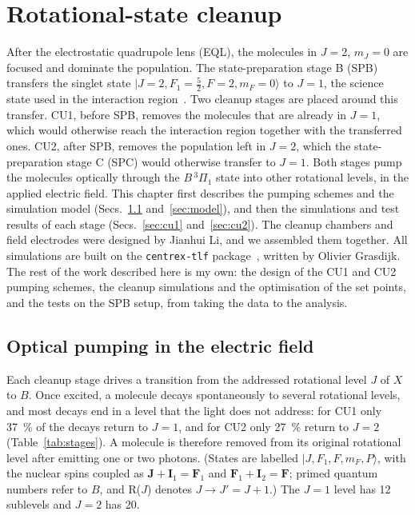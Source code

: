 \documentclass[11pt,a4paper,oneside]{report}
\newcommand{\code}[1]{\texttt{#1}}
\begin{document}
\chapter{Rotational-state cleanup}
\label{ch:cleanup}

After the electrostatic quadrupole lens (EQL), the molecules in $J=2$, $m_J=0$ are focused and
dominate the population. The state-preparation stage B (SPB) transfers the singlet state
$|J=2,F_1=\tfrac52,F=2,m_F=0\rangle$ to $J=1$, the science state used in the interaction
region~\cite{Grasdijk2021}. Two cleanup stages are placed around this transfer. CU1, before SPB,
removes the molecules that are already in $J=1$, which would otherwise reach the interaction region
together with the transferred ones. CU2, after SPB, removes the population left in $J=2$, which the
state-preparation stage C (SPC) would otherwise transfer to $J=1$. Both stages pump the molecules
optically through the $B\,{}^3\Pi_1$ state into other rotational levels, in the applied electric
field. This chapter first describes the pumping schemes and the simulation model
(Secs.~\ref{sec:pumping} and~\ref{sec:model}), and then the simulations and test results of each
stage (Secs.~\ref{sec:cu1} and~\ref{sec:cu2}). The cleanup chambers and field electrodes were
designed by Jianhui Li, and we assembled them together. All
simulations are built on the \code{centrex-tlf} package~\cite{centrextlf}, written by Olivier
Grasdijk. The rest of the work described here is my own: the design of the
CU1 and CU2 pumping schemes, the cleanup simulations and the optimisation of the set points, and the
tests on the SPB setup, from taking the data to the analysis.


\section{Optical pumping in the electric field}
\label{sec:pumping}

Each cleanup stage drives a transition from the addressed rotational level $J$ of $X$ to $B$. Once
excited, a molecule decays spontaneously to several rotational levels, and most decays end in a level
that the light does not address: for CU1 only \SI{37}{\percent} of the decays return to $J=1$, and for
CU2 only \SI{27}{\percent} return to $J=2$ (Table~\ref{tab:stages}). A molecule is therefore removed
from its original rotational level after emitting one or two photons.
(States are labelled $|J,F_1,F,m_F,P\rangle$, with the nuclear spins coupled as
$\mathbf J+\mathbf I_1=\mathbf F_1$ and $\mathbf F_1+\mathbf I_2=\mathbf F$; primed quantum numbers
refer to $B$, and R($J$) denotes $J\to J'=J+1$.) The $J=1$ level has 12 sublevels and $J=2$ has 20.
\end{document}
